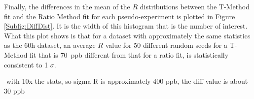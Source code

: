 
Finally, the differences in the mean of the $R$ distributions between the T-Method fit and the Ratio Method fit for each pseudo-experiment is plotted in Figure \ref{Subfig:DiffDist}. It is the width of this histogram that is the number of interest. What this plot shows is that for a dataset with approximately the same statistics as the 60h dataset, an average $R$ value for 50 different random seeds for a T-Method fit that is \SI{70}{ppb} different from that for a ratio fit, is statistically consistent to 1 $\sigma$. 



-with 10x the stats, so sigma R is approximately 400 ppb, the diff value is about 30 ppb




